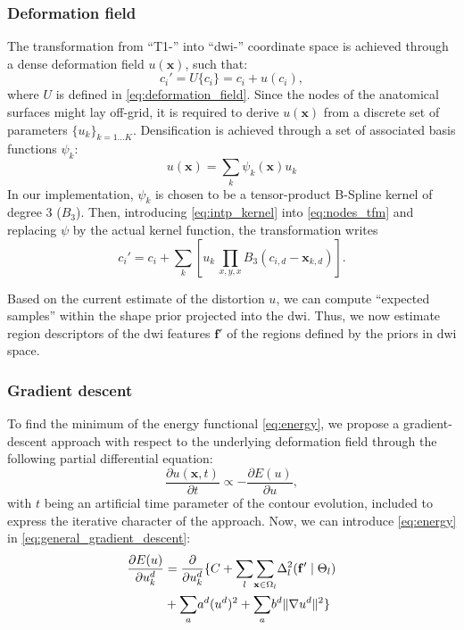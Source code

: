 \subsubsection{Deformation field}
\label{sec:deformation_field}
The transformation from ``T1-'' into ``\gls{dwi}-'' coordinate space is 
achieved through a dense deformation field $u(\mathbf{x})$, such that:
\begin{equation}
c_i' = U\{c_i\} = c_i + u(c_i),
\label{eq:nodes_tfm}
\end{equation}
where $U$ is defined in \eqref{eq:deformation_field}. Since the nodes of the anatomical 
surfaces might lay off-grid, it is required to derive $u(\mathbf{x})$ from a discrete 
set of parameters $\{u_k\}_{k=1 \ldots K}$. Densification is achieved through 
a set of associated basis functions $\psi_k$:
%
\begin{equation}
u(\mathbf{x}) = \sum_k \psi_k(\mathbf{x}) u_k
\label{eq:intp_kernel}
\end{equation}
%
In our implementation, $\psi_k$ is chosen to be a tensor-product B-Spline kernel
of degree 3 ($B_3$).
Then, introducing \eqref{eq:intp_kernel} into \eqref{eq:nodes_tfm} and replacing
$\psi$ by the actual kernel function, the transformation writes
%
\begin{equation}
c_i' = c_i + \sum_k \left[ u_k \, \underset{x,y,x}{\prod} B_3(c_{i,d} - \mathbf{x}_{k,d}) \right].
\label{eq:transformation}
\end{equation} 

Based on the current estimate of the distortion $u$, we can compute 
``expected samples'' within the shape prior projected into the \gls{dwi}.
Thus, we now estimate region descriptors of the \gls{dwi} features 
$\mathbf{f}'$ of the regions defined by the priors in \gls{dwi} space.

\subsubsection{Gradient descent}
To find the minimum of the energy functional \eqref{eq:energy},
we propose a gradient-descent approach with respect to the underlying 
deformation field through the following partial differential equation:
\begin{equation}
\frac{\partial u(\mathbf{x},t)}{\partial t} \propto - \frac{\partial E(u)}{\partial u},
\label{eq:general_gradient_descent}
\end{equation}
with $t$ being an artificial time parameter of the contour
evolution, included to express the iterative character of the approach.
Now, we can introduce \eqref{eq:energy} in
\eqref{eq:general_gradient_descent}:
\begin{align}
\frac{\partial E(u)}{\partial u^d_k} &=
\frac{ \partial }{\partial u^d_k} \lbrace
C + \underset{l}{\sum}
\underset{\mathbf{x} \in \Omega_l}{\sum}
\Delta^2_l (\mathbf{f}' \mid \Theta_l ) \notag\\
&+ \underset{a}{\sum} a^d ({u^d})^2
+ \underset{a}{\sum} b^d \|\nabla u^d\|^2
\rbrace
\label{eq:gradient_descent}
\end{align}


